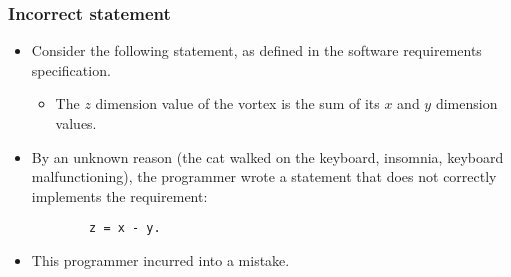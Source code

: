 \begin{frame}[hasprev=false, hasnext=false, fragile]
\label{example:incorrect-statement-1}
\frametitle{Incorrect statement}

\begin{itemize}
	\item Consider the following statement, as defined in the software
	requirements specification.
	\begin{itemize}
		\item The $z$ dimension value of the vortex is the sum of its $x$ and
		$y$ dimension values.
	\end{itemize}

	\item By an unknown reason (the cat walked on the keyboard, insomnia,
	keyboard malfunctioning), the programmer wrote a statement that does
	not correctly implements the requirement:
	\begin{lstlisting}
		z = x - y.
	\end{lstlisting}

	\item This programmer incurred into a mistake.
\end{itemize}
\end{frame}
